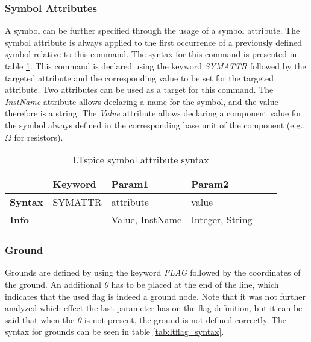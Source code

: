 \subsubsection{Symbol Attributes}

A symbol can be further specified through the usage of a symbol attribute.
The symbol attribute is always applied to the first occurrence of a previously defined symbol relative to this command.
The syntax for this command is presented in table \ref{tab:ltsymattr_syntax}.
This command is declared using the keyword \textit{SYMATTR} followed by the targeted attribute and the corresponding value to be set for the targeted attribute.
Two attributes can be used as a target for this command.
The \textit{InstName} attribute allows declaring a name for the symbol, and the value therefore is a string.
The \textit{Value} attribute allows declaring a component value for the symbol always defined in the corresponding base unit of the component (e.g., $\Omega$ for resistors).

\begin{table}[H]
\begin{center}

\begin{tabular}{l|l|l|l|l|l}
    & \textbf{Keyword} & \textbf{Param1} & \textbf{Param2}\\
    \hline
    \textbf{Syntax} & SYMATTR & attribute & value\\
    \textbf{Info} & & Value, InstName & Integer, String\\
\end{tabular}
\caption{LTspice symbol attribute syntax}
\label{tab:ltsymattr_syntax}

\end{center}
\end{table}

\subsubsection{Ground}

Grounds are defined by using the keyword \textit{FLAG} followed by the coordinates of the ground.
An additional \textit{0} has to be placed at the end of the line, which indicates that the used flag is indeed a ground node.
Note that it was not further analyzed which effect the last parameter has on the flag definition, but it can be said that when the \textit{0} is not present, the ground is not defined correctly.
The syntax for grounds can be seen in table \ref{tab:ltflag_syntax}.

